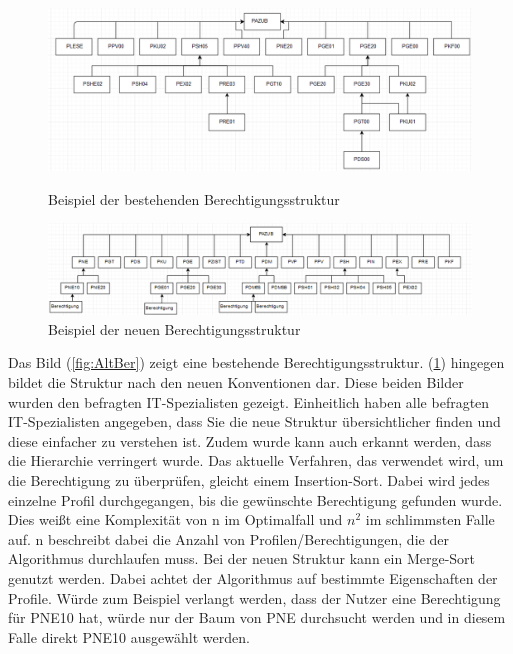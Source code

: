 \begin{figure}[h!]
\hspace*{-2cm}
 \centering
 \includegraphics[width=1.25\textwidth]{gfx/Picture/Vorher.PNG}
 \caption{Beispiel der bestehenden Berechtigungsstruktur}
 \label{fig:AltBer}
\hspace*{-2cm}
 \centering
 \includegraphics[width=1.25\textwidth]{gfx/Picture/Nachher.PNG}
 \caption{Beispiel der neuen Berechtigungsstruktur}
 \label{fig:NeuBer}
\end{figure}
Das Bild (\ref{fig:AltBer}) zeigt eine bestehende Berechtigungsstruktur.
(\ref{fig:NeuBer}) hingegen bildet die Struktur nach den neuen Konventionen dar.
Diese beiden Bilder wurden den befragten IT-Spezialisten gezeigt.
Einheitlich haben alle befragten IT-Spezialisten angegeben, dass Sie die neue Struktur übersichtlicher finden und diese einfacher zu verstehen ist.
Zudem wurde kann auch erkannt werden, dass die Hierarchie verringert wurde.
\newline
Das aktuelle Verfahren, das verwendet wird, um die Berechtigung zu überprüfen, gleicht einem Insertion-Sort.
Dabei wird jedes einzelne Profil durchgegangen, bis die gewünschte Berechtigung gefunden wurde.
Dies weißt eine Komplexität von n im Optimalfall und $n^2$ im schlimmsten Falle auf.
n beschreibt dabei die Anzahl von Profilen/Berechtigungen, die der Algorithmus durchlaufen muss. \cite[12]{log} \cite{weblogMer}
\newline
Bei der neuen Struktur kann ein Merge-Sort genutzt werden.
Dabei achtet der Algorithmus auf bestimmte Eigenschaften der Profile.
Würde zum Beispiel verlangt werden, dass der Nutzer eine Berechtigung für PNE10 hat, würde nur der Baum von PNE durchsucht werden und in diesem Falle direkt PNE10 ausgewählt werden.
